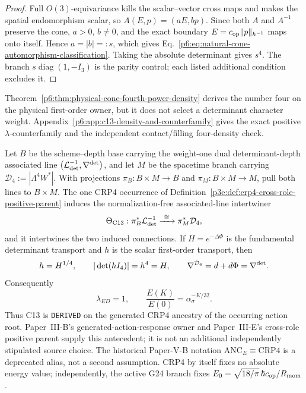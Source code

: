 \documentclass[11pt,a4paper]{article}
\begin{document}
\begin{proof}
Full $O(3)$-equivariance kills the scalar--vector cross maps and makes the
spatial endomorphism scalar, so $A(E,p)=(aE,bp)$.  Since both $A$ and
$A^{-1}$ preserve the cone, $a>0$, $b\ne0$, and the exact boundary
$E=c_{\rm op}\|p\|_{h^{-1}}$ maps onto itself.  Hence $a=|b|=:s$, which
gives Eq.~\eqref{p6:eq:natural-cone-automorphism-classification}.  Taking the
absolute determinant gives $s^4$.  The branch
$s\operatorname{diag}(1,-I_3)$ is the parity control; each listed additional
condition excludes it.
\end{proof}

Theorem~\ref{p6:thm:physical-cone-fourth-power-density} derives the number
four on the physical first-order owner, but it does not select a determinant
character weight.  Appendix~\ref{p6:app:c13-density-and-counterfamily} gives
the exact positive \(\lambda\)-counterfamily and the independent
contact/filling four-density check.

\begin{theorem}
\label{p6:thm:c13-detframe-closure-condition}
\label{p6:thm:crp4-c13-discharge}
Let $B$ be the scheme--depth base carrying the weight-one dual
determinant-depth associated line
$\bigl(\mathcal L_{\rm det}^{-1},\nabla^{\rm det}\bigr)$, and let $M$ be the
spacetime branch carrying
\(\mathcal D_4:=|\Lambda^4W^*|\).  With projections
\(\pi_B:B\times M\to B\) and \(\pi_M:B\times M\to M\), pull both lines to
$B\times M$.  The one
CRP4 occurrence of
Definition~\ref{p3e:def:crp4-cross-role-positive-parent} induces the
normalization-free associated-line intertwiner
\begin{equation}
\label{p6:eq:c13-detframe-common-base-map}
 \Theta_{\rm C13}:\pi_B^*\mathcal L_{\rm det}^{-1}
 \xrightarrow{\ \cong\ }\pi_M^*\mathcal D_4,
\end{equation}
and it intertwines the two induced connections.  If $H=e^{-\Delta\Phi}$ is
the fundamental determinant transport and $h$ is the scalar first-order
transport, then
\[
 h=H^{1/4},\qquad |\det(hI_4)|=h^4=H,
 \qquad
 \nabla^{\mathcal D_4}=d+d\Phi=\nabla^{\rm det}.
\]
Consequently
\begin{equation}
\label{p6:eq:c13-quarter-weight-consequence}
 \boxed{\lambda_{ED}=1},
 \qquad
 \frac{E(K)}{E(0)}=\alpha_\sigma^{-K/32}.
\end{equation}
Thus C13 is \texttt{DERIVED} on the generated CRP4 ancestry of the
occurring action root.  Paper~III-B's generated-action-response owner and
Paper~III-E's cross-role positive parent supply this antecedent; it is not
an additional independently stipulated source choice.  The historical Paper-V-B notation
\(\mathrm{ANC}_E\equiv\mathrm{CRP4}\) is a deprecated alias, not a second
assumption.  CRP4 by itself fixes no absolute energy value; independently,
the active G24 branch fixes \(E_0=\sqrt{18/\pi}\,\hbar c_{\rm op}/R_{\rm mom}\).
\end{theorem}
\end{document}
